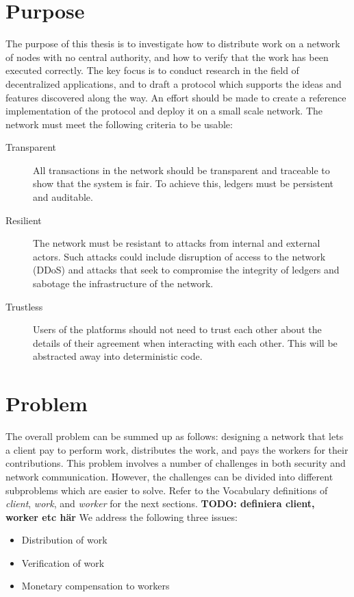 \section{Purpose}
The purpose of this thesis is to investigate how to distribute work on a network of nodes with no central authority, and how to verify that the work has been executed correctly. The key focus is to conduct research in the field of decentralized applications, and to draft a protocol which supports the ideas and features discovered along the way. An effort should be made to create a reference implementation of the protocol and deploy it on a small scale network. The network must meet the following criteria to be usable:
\begin{description}
\item[Transparent] All transactions in the network should be transparent and traceable to show that the system is fair. To achieve this, ledgers must be persistent and auditable.
\item[Resilient] The network must be resistant to attacks from internal and external actors. Such attacks could include disruption of access to the network (DDoS) and attacks that seek to compromise the integrity of ledgers and sabotage the infrastructure of the network.
\item[Trustless] Users of the platforms should not need to trust each other about the details of their agreement when interacting with each other. This will be abstracted away into deterministic code.
\end{description}

\section{Problem}
The overall problem can be summed up as follows: designing a network that lets a client pay to perform work, distributes the work, and pays the workers for their contributions. This problem involves a number of challenges in both security and network communication. However, the challenges can be divided into different subproblems which are easier to solve. Refer to the Vocabulary definitions of \emph{client}, \emph{work}, and \emph{worker} for the next sections. \textbf{TODO: definiera client, worker etc här}
We address the following three issues:
\begin{itemize}
\item Distribution of work
\item Verification of work
\item Monetary compensation to workers
\end{itemize}


